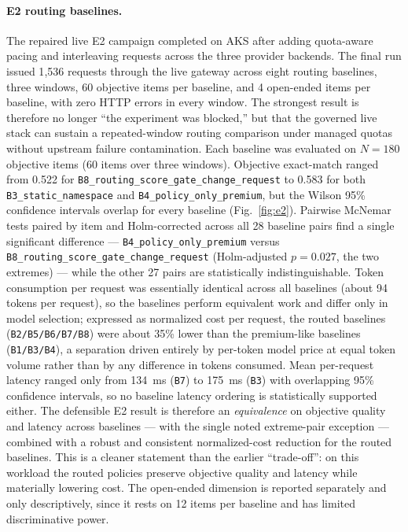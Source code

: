 \paragraph{E2 routing baselines.}
The repaired live E2 campaign completed on AKS after adding quota-aware pacing and interleaving requests across the three provider backends. The final run issued 1{,}536 requests through the live gateway across eight routing baselines, three windows, 60 objective items per baseline, and 4 open-ended items per baseline, with zero HTTP errors in every window. The strongest result is therefore no longer ``the experiment was blocked,'' but that the governed live stack can sustain a repeated-window routing comparison under managed quotas without upstream failure contamination. Each baseline was evaluated on $N=180$ objective items (60 items over three windows). Objective exact-match ranged from 0.522 for \texttt{B8\_routing\_score\_gate\_change\_request} to 0.583 for both \texttt{B3\_static\_namespace} and \texttt{B4\_policy\_only\_premium}, but the Wilson 95\% confidence intervals overlap for every baseline (Fig.~\ref{fig:e2}). Pairwise McNemar tests paired by item and Holm-corrected across all 28 baseline pairs find a single significant difference --- \texttt{B4\_policy\_only\_premium} versus \texttt{B8\_routing\_score\_gate\_change\_request} (Holm-adjusted $p=0.027$, the two extremes) --- while the other 27 pairs are statistically indistinguishable. Token consumption per request was essentially identical across all baselines (about 94 tokens per request), so the baselines perform equivalent work and differ only in model selection; expressed as normalized cost per request, the routed baselines (\texttt{B2/B5/B6/B7/B8}) were about 35\% lower than the premium-like baselines (\texttt{B1/B3/B4}), a separation driven entirely by per-token model price at equal token volume rather than by any difference in tokens consumed. Mean per-request latency ranged only from 134~ms (\texttt{B7}) to 175~ms (\texttt{B3}) with overlapping 95\% confidence intervals, so no baseline latency ordering is statistically supported either. The defensible E2 result is therefore an \emph{equivalence} on objective quality and latency across baselines --- with the single noted extreme-pair exception --- combined with a robust and consistent normalized-cost reduction for the routed baselines. This is a cleaner statement than the earlier ``trade-off'': on this workload the routed policies preserve objective quality and latency while materially lowering cost. The open-ended dimension is reported separately and only descriptively, since it rests on 12 items per baseline and has limited discriminative power.

